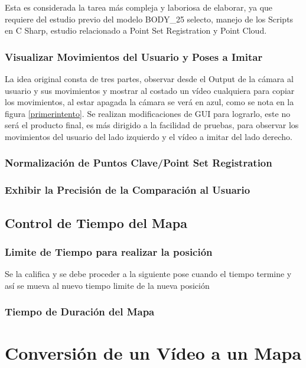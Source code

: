 Esta es considerada la tarea más compleja y laboriosa de elaborar, ya que requiere del estudio previo del modelo BODY\_25 selecto, manejo de los Scripts en C Sharp, estudio relacionado a Point Set Registration y Point Cloud. 


\subsubsection{Visualizar Movimientos del Usuario y Poses a Imitar}

La idea original consta de tres partes, observar desde el Output de la cámara al usuario y sus movimientos y mostrar al costado un vídeo cualquiera para copiar los movimientos, al estar apagada la cámara se verá en azul, como se nota en la figura \ref{primerintento}.  Se realizan modificaciones de GUI para lograrlo, este no será el producto final, es más dirigido a la facilidad de pruebas, para observar los movimientos del usuario del lado izquierdo y el vídeo a imitar del lado derecho.


\subsubsection{Normalización de Puntos Clave/Point Set Registration}

\subsubsection{Exhibir la Precisión de la Comparación al Usuario}

\subsection{Control de Tiempo del Mapa}

\subsubsection{Limite de Tiempo para realizar la posición}

Se la califica y se debe proceder a la siguiente pose cuando el tiempo termine y así se mueva al nuevo tiempo limite de la nueva posición

\subsubsection{Tiempo de Duración del Mapa}



\section{Conversión de un Vídeo a un Mapa}

